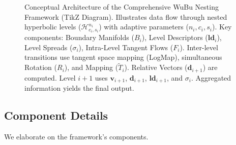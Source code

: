 \documentclass[11pt, twoside]{article} %
\newcommand{\HypSpaceCmd}[3]{\mathcal{H}^{#1}_{#2, #3}} %
\begin{document}
\begin{figure}[htbp]
    \caption{Conceptual Architecture of the Comprehensive WuBu Nesting Framework (TikZ Diagram). Illustrates data flow through nested hyperbolic levels (\texorpdfstring{$\HypSpaceCmd{n_i}{c_i}{s_i}$}{H ni ci si}) with adaptive parameters (\texorpdfstring{$n_i, c_i, s_i$}{ni, ci, si}). Key components: Boundary Manifolds (\texorpdfstring{$B_{i}$}{Bi}), Level Descriptors (\texorpdfstring{$\mathbf{ld}_i$}{ld i}), Level Spreads (\texorpdfstring{$\sigma_i$}{sigma i}), Intra-Level Tangent Flows (\texorpdfstring{$F_i$}{Fi}). Inter-level transitions use tangent space mapping (LogMap), simultaneous Rotation (\texorpdfstring{$R_i$}{Ri}), and Mapping (\texorpdfstring{$\tilde{T}_i$}{Ttilde i}). Relative Vectors (\texorpdfstring{$\mathbf{d}_{i+1}$}{d i+1}) are computed. Level $i+1$ uses \texorpdfstring{$\mathbf{v}_{i+1}$}{v i+1}, \texorpdfstring{$\mathbf{d}_{i+1}$}{d i+1}, \texorpdfstring{$\mathbf{ld}_{i+1}$}{ld i+1}, and \texorpdfstring{$\sigma_i$}{sigma i}. Aggregated information yields the final output.}
    \label{fig:architecture_tikz}
\end{figure}


\subsection{Component Details}
\label{subsec:component_details}
We elaborate on the framework's components.

\end{document}

